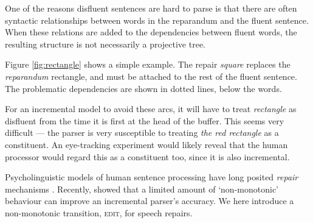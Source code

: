 \documentclass[11pt,letterpaper]{article}
\begin{document}
One of the reasons disfluent sentences are hard to parse is that there are often
syntactic relationships between words in the reparandum and the fluent sentence.
When these relations are added to the dependencies between fluent words,
the resulting structure is not necessarily a projective tree.

Figure \ref{fig:rectangle} shows a simple example.
The repair \emph{square} replaces the \emph{reparandum} rectangle, and must be
attached to the rest of the fluent sentence.
The problematic dependencies are shown in dotted lines, below the words.

For an incremental model to avoid these arcs, it will have to treat \emph{rectangle}
as disfluent from the time it is first at the head of the buffer.  This seems
very difficult --- the parser is very susceptible to
treating \emph{the red rectangle} as a constituent.  An eye-tracking experiment
would likely reveal that the human processor would regard this as a constituent
too, since it is also incremental.

Psycholinguistic models of human sentence processing have long posited
\emph{repair} mechanisms \citep{FrazierRayner1982}.  Recently, \citet{honnibal:13}
showed that a limited amount of `non-monotonic' behaviour can 
improve an incremental parser's accuracy.
We here introduce a non-monotonic transition, \textsc{edit}, for speech
repairs. 
\end{document}
